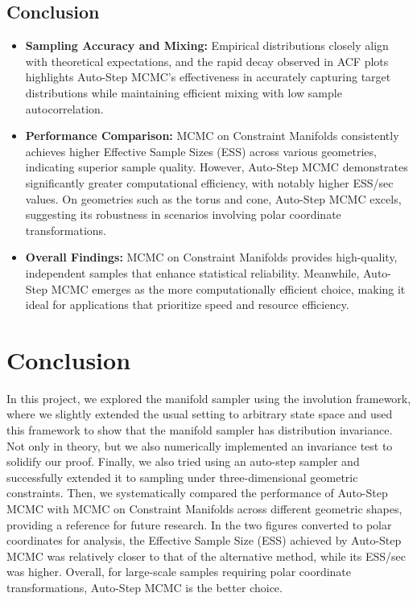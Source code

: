 \documentclass{article}
\begin{document}
\subsection{Conclusion}


\begin{itemize}
    \item \textbf{Sampling Accuracy and Mixing:}  
    Empirical distributions closely align with theoretical expectations, and the rapid decay observed in ACF plots highlights Auto-Step MCMC's effectiveness in accurately capturing target distributions while maintaining efficient mixing with low sample autocorrelation.
    
    \item \textbf{Performance Comparison:}  
    MCMC on Constraint Manifolds consistently achieves higher Effective Sample Sizes (ESS) across various geometries, indicating superior sample quality. However, Auto-Step MCMC demonstrates significantly greater computational efficiency, with notably higher ESS/sec values. On geometries such as the torus and cone, Auto-Step MCMC excels, suggesting its robustness in scenarios involving polar coordinate transformations.
    
    \item \textbf{Overall Findings:}  
    MCMC on Constraint Manifolds provides high-quality, independent samples that enhance statistical reliability. Meanwhile, Auto-Step MCMC emerges as the more computationally efficient choice, making it ideal for applications that prioritize speed and resource efficiency.
\end{itemize}


\section{Conclusion}
In this project, we explored the manifold sampler using the involution framework, where we slightly extended the usual setting to arbitrary state space and used this framework to show that the manifold sampler has distribution invariance. Not only in theory, but we also numerically implemented an invariance test to solidify our proof. Finally, we also tried using an auto-step sampler and successfully extended it to sampling under three-dimensional geometric constraints. Then, we systematically compared the performance of Auto-Step MCMC with MCMC on Constraint Manifolds across different geometric shapes, providing a reference for future research. In the two figures converted to polar coordinates for analysis, the Effective Sample Size (ESS) achieved by Auto-Step MCMC was relatively closer to that of the alternative method, while its ESS/sec was higher. Overall, for large-scale samples requiring polar coordinate transformations, Auto-Step MCMC is the better choice.
\end{document}
